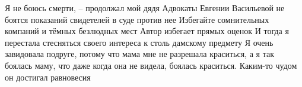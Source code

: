 Я не боюсь смерти, -- продолжал мой дядя
Адвокаты Евгении Васильевой не боятся показаний свидетелей в суде против нее
Избегайте сомнительных компаний и тёмных безлюдных мест
Автор избегает прямых оценок
И тогда я перестала стесняться своего интереса к столь дамскому предмету
Я очень завидовала подруге, потому что мама мне не разрешала краситься, а я так боялась маму, что даже когда она не видела, боялась краситься.
Каким-то чудом он достигал равновесия
